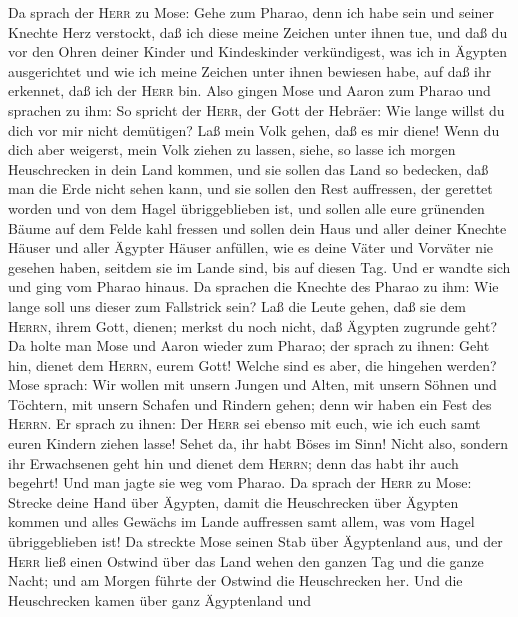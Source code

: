  Da sprach der \textsc{Herr} zu Mose: Gehe zum Pharao,
denn ich habe sein und seiner Knechte Herz verstockt, daß ich diese
meine Zeichen unter ihnen tue,  und daß du vor den Ohren
deiner Kinder und Kindeskinder verkündigest, was ich in Ägypten
ausgerichtet und wie ich meine Zeichen unter ihnen bewiesen habe, auf
daß ihr erkennet, daß ich der \textsc{Herr} bin.  Also
gingen Mose und Aaron zum Pharao und sprachen zu ihm: So spricht der
\textsc{Herr}, der Gott der Hebräer: Wie lange willst du dich vor mir
nicht demütigen? Laß mein Volk gehen, daß es mir diene! 
Wenn du dich aber weigerst, mein Volk ziehen zu lassen, siehe, so lasse
ich morgen Heuschrecken in dein Land kommen,  und sie
sollen das Land so bedecken, daß man die Erde nicht sehen kann, und sie
sollen den Rest auffressen, der gerettet worden und von dem Hagel
übriggeblieben ist, und sollen alle eure grünenden Bäume auf dem Felde
kahl fressen  und sollen dein Haus und aller deiner
Knechte Häuser und aller Ägypter Häuser anfüllen, wie es deine Väter und
Vorväter nie gesehen haben, seitdem sie im Lande sind, bis auf diesen
Tag. Und er wandte sich und ging vom Pharao hinaus.  Da
sprachen die Knechte des Pharao zu ihm: Wie lange soll uns dieser zum
Fallstrick sein? Laß die Leute gehen, daß sie dem \textsc{Herrn}, ihrem
Gott, dienen; merkst du noch nicht, daß Ägypten zugrunde geht?
 Da holte man Mose und Aaron wieder zum Pharao; der sprach
zu ihnen: Geht hin, dienet dem \textsc{Herrn}, eurem Gott! Welche sind
es aber, die hingehen werden?  Mose sprach: Wir wollen mit
unsern Jungen und Alten, mit unsern Söhnen und Töchtern, mit unsern
Schafen und Rindern gehen; denn wir haben ein Fest des \textsc{Herrn}.
 Er sprach zu ihnen: Der \textsc{Herr} sei ebenso mit
euch, wie ich euch samt euren Kindern ziehen lasse! Sehet da, ihr habt
Böses im Sinn!  Nicht also, sondern ihr Erwachsenen geht
hin und dienet dem \textsc{Herrn}; denn das habt ihr auch begehrt! Und
man jagte sie weg vom Pharao.  Da sprach der
\textsc{Herr} zu Mose: Strecke deine Hand über Ägypten, damit die
Heuschrecken über Ägypten kommen und alles Gewächs im Lande auffressen
samt allem, was vom Hagel übriggeblieben ist!  Da
streckte Mose seinen Stab über Ägyptenland aus, und der \textsc{Herr}
ließ einen Ostwind über das Land wehen den ganzen Tag und die ganze
Nacht; und am Morgen führte der Ostwind die Heuschrecken her.
 Und die Heuschrecken kamen über ganz Ägyptenland und
